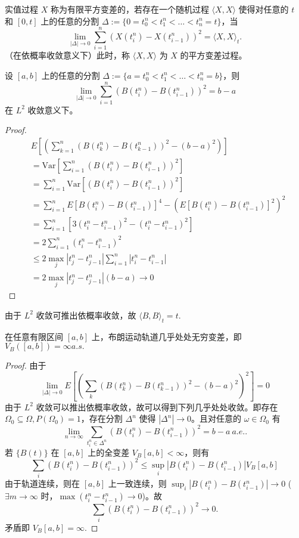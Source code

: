 \documentclass[lang=cn,10pt,thmcnt=section]{elegantbook}
\begin{document}
\begin{definition}
	实值过程 \( X \) 称为有限平方变差的，若存在一个随机过程 \(\langle X, X \rangle\) 使得对任意的 \( t \) 和 \([0, t]\) 上的任意的分割 \(\Delta := \{0 = t_0^n < t_1^n < \ldots < t_n^n = t\}\)，当
\[
\lim_{|\Delta|\to 0} \sum_{i=1}^n (X(t_i^n) - X(t_{i-1}^n))^2 = \langle X, X \rangle_t.
\]
（在依概率收敛意义下）此时，称 \(\langle X, X \rangle\) 为 \( X \) 的平方变差过程。
\end{definition}
\begin{theorem}
	设 \([a, b]\) 上的任意的分割 \(\Delta := \{a = t_0^n < t_1^n < \ldots < t_n^n = b\}\)，则
\[
\lim_{|\Delta|\to 0} \sum_{i=1}^n (B(t_i^n) - B(t_{i-1}^n))^2 = b - a
\]
在 \(L^2\) 收敛意义下。
\end{theorem}
\begin{proof}
	\begin{align*}
		&E\left[\left(\sum_{k=1}^n (B(t_k^n) - B(t_{k-1}^n))^2 - (b-a)^2\right)\right] \\
		&= \text{Var}\left[\sum_{i=1}^n (B(t_i^n) - B(t_{i-1}^n))^2\right] \\
		&= \sum_{i=1}^n \text{Var}\left[(B(t_i^n) - B(t_{i-1}^n))^2\right] \\
		&= \sum_{i=1}^n E\left[B(t_i^n) - B(t_{i-1}^n)\right]^4 - \left(E\left[B(t_i^n) - B(t_{i-1}^n)\right]^2\right)^2 \\
		&= \sum_{i=1}^n \left[3(t_i^n - t_{i-1}^n)^2 - (t_i^n - t_{i-1}^n)^2\right] \\
		&= 2\sum_{i=1}^n (t_i^n - t_{i-1}^n)^2\\
		&\leq 2 \max_j |t_j^n - t_{j-1}^n| \sum_{i=1}^n |t_i^n - t_{i-1}^n| \\
		&= 2 \max_j |t_j^n - t_{j-1}^n| (b-a) \to 0
	\end{align*}
\end{proof}
\begin{remark}

	由于 \(L^2\) 收敛可推出依概率收敛，故 \(\langle B, B \rangle_t = t\).
\end{remark}
\begin{corollary}
	在任意有限区间 \([a, b]\) 上，布朗运动轨道几乎处处无穷变差，即 \(V_B([a,b]) = \infty a.s.\)
\end{corollary}
\begin{proof}
	由于
\[
\lim_{|\Delta|\to 0} E\left[\left(\sum_{k} (B(t_k^n) - B(t_{k-1}^n))^2 - (b-a)^2\right)^2\right] = 0
\]
由于 \(L^2\) 收敛可以推出依概率收敛，故可以得到下列几乎处处收敛。即存在 \(\Omega_0 \subseteq \Omega, P(\Omega_0) = 1\)，存在分割 \(\Delta^n\) 使得 \(|\Delta^n| \to 0\)。且对任意的 \(\omega \in \Omega_0\) 有
\[
\lim_{n\to\infty} \sum_{t_i^n \in \Delta^n} (B(t_i^n) - B(t_{i-1}^n))^2 = b - a \ a.e..
\]
若 \(\{B(t)\}\) 在 \([a, b]\) 上的全变差 \(V_B[a, b] < \infty\)，则有
\[
\sum_i (B(t_i^n) - B(t_{i-1}^n))^2 \leq \sup_i |B(t_i^n) - B(t_{i-1}^n)| V_B[a, b]
\]
由于轨道连续，则在 \([a, b]\) 上一致连续，则 \(\sup_i |B(t_i^n) - B(t_{i-1}^n)| \to 0\) (\(\exists m \to \infty\) 时，\(\max (t_i^n - t_{i-1}^n) \to 0\))。故
\[
\sum_i (B(t_i^n) - B(t_{i-1}^n))^2 \to 0.
\]
矛盾即 \(V_B[a, b] = \infty\).
\end{proof}
\end{document}
